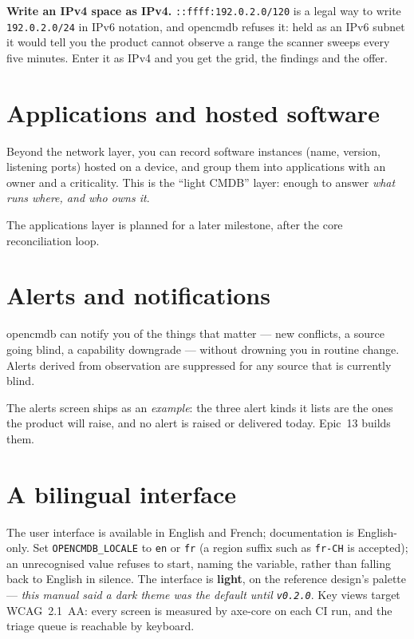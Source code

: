 \documentclass[11pt,oneside,listof=totoc,bibliography=totoc]{scrreprt}
\begin{document}
\textbf{Write an IPv4 space as IPv4.} \texttt{::ffff:192.0.2.0/120} is a legal way to write
\texttt{192.0.2.0/24} in IPv6 notation, and opencmdb refuses it: held as an IPv6 subnet it would
tell you the product cannot observe a range the scanner sweeps every five minutes. Enter it as IPv4
and you get the grid, the findings and the offer.

\chapter{Applications and hosted software}
Beyond the network layer, you can record software instances (name, version, listening ports)
hosted on a device, and group them into applications with an owner and a criticality. This
is the ``light CMDB'' layer: enough to answer \emph{what runs where, and who owns it}.

\begin{planned}
The applications layer is planned for a later milestone, after the core reconciliation loop.
\end{planned}

\chapter{Alerts and notifications}
opencmdb can notify you of the things that matter — new conflicts, a source going blind, a
capability downgrade — without drowning you in routine change. Alerts derived from
observation are suppressed for any source that is currently blind.

\begin{planned}
The alerts screen ships as an \emph{example}: the three alert kinds it lists are the ones the
product will raise, and no alert is raised or delivered today. Epic~13 builds them.
\end{planned}

\chapter{A bilingual interface}
The user interface is available in English and French; documentation is English-only. Set
\texttt{OPENCMDB\_LOCALE} to \texttt{en} or \texttt{fr} (a region suffix such as
\texttt{fr-CH} is accepted); an unrecognised value refuses to start, naming the variable,
rather than falling back to English in silence. The interface is \textbf{light}, on the
reference design's palette --- \emph{this manual said a dark theme was the default until
\texttt{v0.2.0}}. Key views target WCAG~2.1~AA: every screen is measured by axe-core on each
CI run, and the triage queue is reachable by keyboard.
\end{document}

